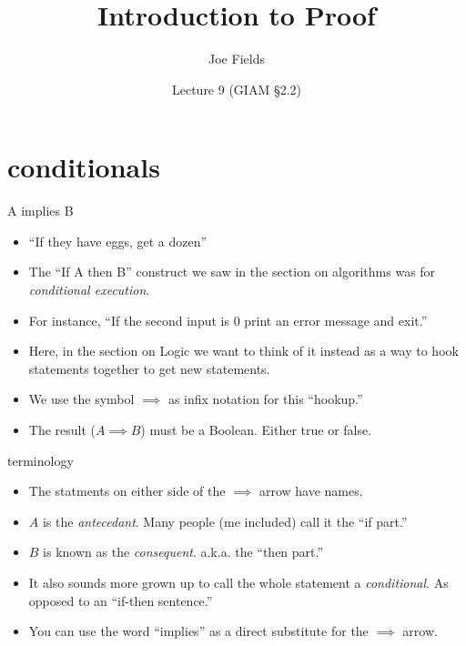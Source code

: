 \documentclass[landscape]{beamer}
\author{Joe Fields}
\title{Introduction to Proof}
\date{Lecture 9 (GIAM \S 2.2)}
\institute[SCSU]{ {\tt fieldsj1@southernct.edu} }
\begin{document}
\begin{frame}[plain]
  \titlepage
\end{frame}


\section{conditionals}

\begin{frame}{A implies B}
\begin{itemize}
\item ``If they have eggs, get a dozen'' \pause
\item The ``If A then B'' construct we saw in the section on algorithms was for {\em conditional execution}. \pause
\item For instance, ``If the second input is $0$ print an error message and exit.'' \pause
\item Here, in the section on Logic we want to think of it instead as a way to hook statements together to get new statements. \pause
\item We use the symbol $\implies$ as infix notation for this ``hookup.'' \pause
\item The result ($A \implies B$) must be a Boolean. \pause Either true or false. 
\end{itemize}
\end{frame}

\begin{frame}{terminology}
\begin{itemize}
\item The statments on either side of the $\implies$ arrow have names. \pause
\item $A$ is the {\em antecedant}. \pause \newline
Many people (me included) call it the ``if part.'' \pause
\item $B$ is known as the {\em consequent}. \pause \newline 
a.k.a. the ``then part.'' \pause
\item It also sounds more grown up to call the whole statement a {\em conditional}. \pause \newline 
As opposed to an ``if-then sentence.'' \pause
\item You can use the word ``implies'' as a direct substitute for the $\implies$ arrow.
\end{itemize}
\end{frame}
\end{document}
